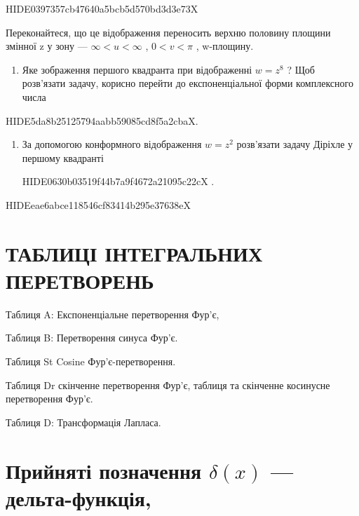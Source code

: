 \documentclass[
  ukrainian,
]{article}
\providecommand{\tightlist}{%
  \setlength{\itemsep}{0pt}\setlength{\parskip}{0pt}}
\begin{document}
HIDE0397357cb47640a5bcb5d570bd3d3e73X

Переконайтеся, що це відображення переносить верхню половину площини
змінної z у зону --- \(\infty < u < \infty\) , \(0 < v < \pi\) ,
w-площину.

\begin{enumerate}
\def\labelenumi{\arabic{enumi}.}
\setcounter{enumi}{1}
\tightlist
\item
  Яке зображення першого квадранта при відображенні \(w=z^{8}\) ? Щоб
  розв'язати задачу, корисно перейти до експоненціальної форми
  комплексного числа
\end{enumerate}

HIDE5da8b25125794aabb59085cd8f5a2cbaX.

\begin{enumerate}
\def\labelenumi{\arabic{enumi}.}
\setcounter{enumi}{2}
\item
  За допомогою конформного відображення \(w=z^2\) розв'язати задачу
  Діріхле у першому квадранті

  HIDE0630b03519f44b7a9f4672a21095c22cX \right.
\end{enumerate}

HIDEeae6abce118546cf83414b295e37638eX

\section{ТАБЛИЦІ ІНТЕГРАЛЬНИХ
ПЕРЕТВОРЕНЬ}\label{ux442ux430ux431ux43bux438ux446ux456-ux456ux43dux442ux435ux433ux440ux430ux43bux44cux43dux438ux445-ux43fux435ux440ux435ux442ux432ux43eux440ux435ux43dux44c-3}

Таблиця A: Експоненціальне перетворення Фур'є,

Таблиця B: Перетворення синуса Фур'є.

Таблиця St Cosine Фур'є-перетворення.

Таблиця Dr скінченне перетворення Фур'є, таблиця та скінченне косинусне
перетворення Фур'є.

Таблиця D: Трансформація Лапласа.

\section{\texorpdfstring{Прийняті позначення \(\delta\left(x\right)\)
---
дельта-функція,}{Прийняті позначення \textbackslash delta\textbackslash left(x\textbackslash right) --- дельта-функція,}}\label{ux43fux440ux438ux439ux43dux44fux442ux456-ux43fux43eux437ux43dux430ux447ux435ux43dux43dux44f-deltaleftxright-ux434ux435ux43bux44cux442ux430-ux444ux443ux43dux43aux446ux456ux44f-2}
\end{document}
